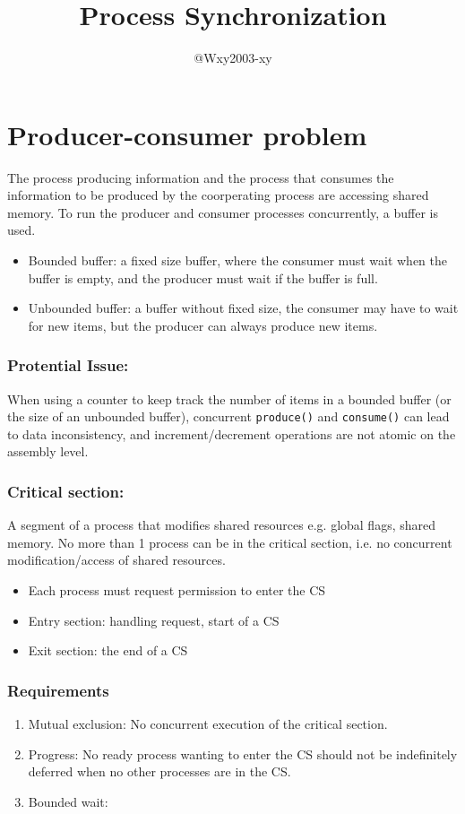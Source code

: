 \documentclass[8pt]{article}
\begin{document}
\title{Process Synchronization}
\author{@Wxy2003-xy}
\date{}
\maketitle
\section{Producer-consumer problem}
The process producing information and the process that consumes the information to be produced by the coorperating process are accessing shared memory. To run the producer and consumer processes concurrently, a buffer is used. 
\begin{itemize}
    \item Bounded buffer: a fixed size buffer, where the consumer must wait when the buffer is empty, and the producer must wait if the buffer is full. 
    \item Unbounded buffer: a buffer without fixed size, the consumer may have to wait for new items, but the producer can always produce new items. 
\end{itemize}
\subsubsection*{Protential Issue:}
When using a counter to keep track the number of items in a bounded buffer (or the size of an unbounded buffer), concurrent \texttt{produce()} and \texttt{consume()} can lead to data inconsistency, and increment/decrement operations are not atomic on the assembly level.
\subsubsection*{Critical section:}
A segment of a process that modifies shared resources e.g. global flags, shared memory. No more than 1 process can be in the critical section, i.e. no concurrent modification/access of shared resources.
\begin{itemize}
    \item Each process must request permission to enter the CS
    \item Entry section: handling request, start of a CS
    \item Exit section: the end of a CS
\end{itemize}
\subsubsection*{Requirements}
\begin{enumerate}
    \item Mutual exclusion: No concurrent execution of the critical section. 
    \item Progress: No ready process wanting to enter the CS should not be indefinitely deferred when no other processes are in the CS.
    \item Bounded wait: 
\end{enumerate}
\end{document}
